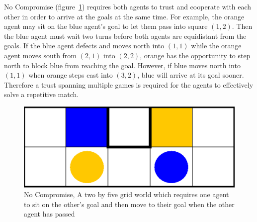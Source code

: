 \documentclass[letterpaper]{article}
\begin{document}
No Compromise (figure~\ref{fig:nocompromise}) requires both agents to trust and cooperate with each other in order to arrive at the goals at the same time. For example, the orange agent may sit on the blue agent's goal to let them pass into square $(1,2)$. Then the blue agent must wait two turns before both agents are equidistant from the goals. If the blue agent defects and moves north into $(1,1)$ while the orange agent moves south from $(2,1)$ into $(2,2)$, orange has the opportunity to step north to block blue from reaching the goal. However, if blue moves north into $(1,1)$ when orange steps east into $(3,2)$, blue will arrive at its goal sooner. Therefore a trust spanning multiple games is required for the agents to effectively solve a repetitive match.

\begin{figure}
\centering
\includegraphics[width=0.8\columnwidth]{figures/nocompromise.png}
\caption{No Compromise, A two by five grid world which requires one agent to sit on the other's goal and then move to their goal when the other agent has passed}
\label{fig:nocompromise}
\end{figure}
\end{document}
